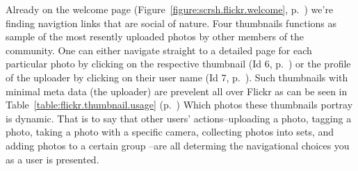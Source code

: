 Already on the welcome page (Figure~\ref{figure:scrsh.flickr.welcome},
p.~\pageref{figure:scrsh.flickr.welcome})
we're finding navigtion links that are social of
nature. Four thumbnails functions as sample of the most resently uploaded
photos by other members of the community. One can either navigate straight to
a detailed page for each particular photo by clicking on the respective
thumbnail (Id 6, p.~\pageref{table:flickr.content.inventory.6})
or the profile of the uploader by clicking on their user
name (Id 7, p.~\pageref{table:flickr.content.inventory.7}). Such thumbnails
with minimal meta data (the uploader) are prevelent all over Flickr as can be
seen in
Table~\ref{table:flickr.thumbnail.usage}
(p.~\pageref{table:flickr.thumbnail.usage})
Which photos these thumbnails portray is dynamic. That is to say that other
users' actions--uploading a photo, tagging a photo, taking a photo with a
specific camera, collecting photos into sets, and adding photos to a certain
group --are all determing the navigational choices you as a user is presented.

